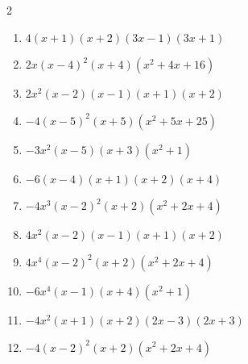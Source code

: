 \documentclass[11pt,oneside]{book}
\begin{document}
\begin{multicols}{2}
\begin{enumerate}[leftmargin=*,label=\textbf{I\arabic*.},itemsep=0.45\baselineskip]
\item $ 4 \left(x + 1\right) \left(x + 2\right) \left(3 x - 1\right) \left(3 x + 1\right) $
\item $ 2 x \left(x - 4\right)^{2} \left(x + 4\right) \left(x^{2} + 4 x + 16\right) $
\item $ 2 x^{2} \left(x - 2\right) \left(x - 1\right) \left(x + 1\right) \left(x + 2\right) $
\item $ - 4 \left(x - 5\right)^{2} \left(x + 5\right) \left(x^{2} + 5 x + 25\right) $
\item $ - 3 x^{2} \left(x - 5\right) \left(x + 3\right) \left(x^{2} + 1\right) $
\item $ - 6 \left(x - 4\right) \left(x + 1\right) \left(x + 2\right) \left(x + 4\right) $
\item $ - 4 x^{3} \left(x - 2\right)^{2} \left(x + 2\right) \left(x^{2} + 2 x + 4\right) $
\item $ 4 x^{2} \left(x - 2\right) \left(x - 1\right) \left(x + 1\right) \left(x + 2\right) $
\item $ 4 x^{4} \left(x - 2\right)^{2} \left(x + 2\right) \left(x^{2} + 2 x + 4\right) $
\item $ - 6 x^{4} \left(x - 1\right) \left(x + 4\right) \left(x^{2} + 1\right) $
\item $ - 4 x^{2} \left(x + 1\right) \left(x + 2\right) \left(2 x - 3\right) \left(2 x + 3\right) $
\item $ - 4 \left(x - 2\right)^{2} \left(x + 2\right) \left(x^{2} + 2 x + 4\right) $
\end{enumerate}
\end{multicols}
\end{document}

